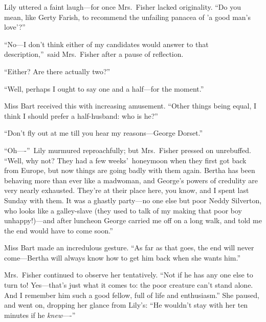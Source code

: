 \documentclass[12pt,a4paper]{book}
\begin{document}
Lily uttered a faint laugh---for once Mrs.\ Fisher lacked
originality. ``Do you mean, like Gerty Farish, to recommend the
unfailing panacea of 'a good man's love'?''





``No---I don't think either of my candidates would answer to that
description,''\ said Mrs.\ Fisher after a pause of reflection.





``Either? Are there actually two?''





``Well, perhaps I ought to say one and a half---for the moment.''





Miss Bart received this with increasing amusement. ``Other things
being equal, I think I should prefer a half-husband: who is he?''





``Don't fly out at me till you hear my reasons---George Dorset.''





``Oh----''\ Lily murmured reproachfully; but Mrs.\ Fisher pressed on
unrebuffed. ``Well, why not? They had a few weeks'\ honeymoon when
they first got back from Europe, but now things are going badly
with them again. Bertha has been behaving more than ever like a
madwoman, and George's powers of credulity are very nearly
exhausted. They're at their place here, you know, and I spent
last Sunday with them. It was a ghastly party---no one else but
poor Neddy Silverton, who looks like a galley-slave (they used to
talk of my making that poor boy unhappy!)---and after
luncheon George carried me off on a long walk, and told me the
end would have to come soon.''





Miss Bart made an incredulous gesture. ``As far as that goes, the
end will never come---Bertha will always know how to get him back
when she wants him.''





Mrs.\ Fisher continued to observe her tentatively. ``Not if he has
any one else to turn to! Yes---that's just what it comes to: the
poor creature can't stand alone. And I remember him such a good
fellow, full of life and enthusiasm.'' She paused, and went on,
dropping her glance from Lily's: ``He wouldn't stay with her ten
minutes if he \textit{knew}----''
\end{document}
